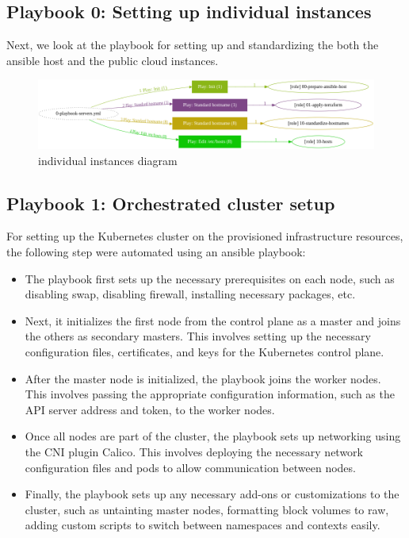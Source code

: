 \subsection{Playbook 0: Setting up individual instances}

Next, we look at the playbook for setting up and standardizing the both the ansible host and the public cloud instances.

\begin{figure}[H]\centering
\includegraphics[width=1.0\textwidth,angle=00]{assets/f17.png}
\caption{individual instances diagram}
\label{fig:individual instances diagram}
\end{figure}

\subsection{Playbook 1: Orchestrated cluster setup}

For setting up the Kubernetes cluster on the provisioned infrastructure resources, the following step were automated using an ansible playbook:

\begin{itemize}[label={--}]
    \item The playbook first sets up the necessary prerequisites on each node, such as disabling swap, disabling firewall, installing necessary packages, etc.
    \item Next, it initializes the first node from the control plane as a master and joins the others as secondary masters. This involves setting up the necessary configuration files, certificates, and keys for the Kubernetes control plane.
    \item After the master node is initialized, the playbook joins the worker nodes. This involves passing the appropriate configuration information, such as the API server address and token, to the worker nodes.
    \item Once all nodes are part of the cluster, the playbook sets up networking using the CNI plugin Calico. This involves deploying the necessary network configuration files and pods to allow communication between nodes.
    \item Finally, the playbook sets up any necessary add-ons or customizations to the cluster, such as untainting master nodes, formatting block volumes to raw, adding custom scripts to switch between namespaces and contexts easily.
\end{itemize}

